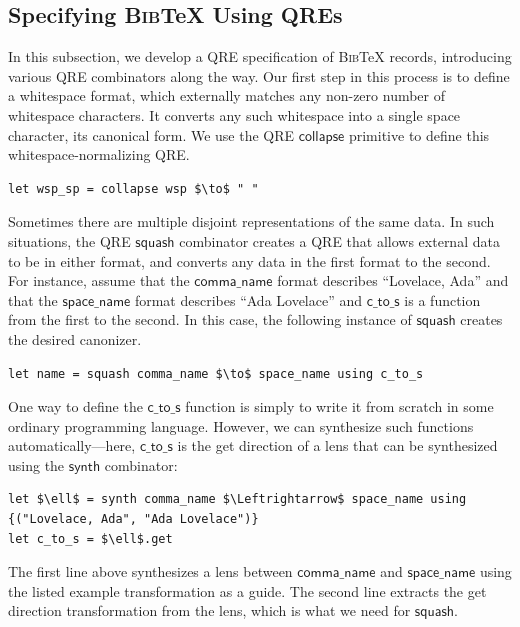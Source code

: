 \documentclass[acmsmall,review,anonymous]{acmart}
\newcommand{\codefont}[1]{\ensuremath{\mathsf{#1}}}
\newcommand{\kw}[1]{\textcolor{dkred}{\ensuremath{\mathsf{#1}}}}
\newcommand{\bibtex}{\textsc{Bib}\TeX{}}
\begin{document}
\subsection{Specifying \bibtex{} Using QREs}
\label{subsec:qre-expressions}
In this subsection, we develop a QRE specification of \bibtex{}
records, introducing various QRE combinators along the way. 
Our first step in this process is to define a
whitespace format, which externally matches any non-zero number of whitespace
characters. It converts any such whitespace into a single space
character, its canonical form. 
We use the QRE \kw{collapse} primitive to define this
whitespace-normalizing QRE.

\begin{lstlisting}
let wsp_sp = collapse wsp $\to$ " "
\end{lstlisting}
\iflastminute
\fi

Sometimes there are multiple disjoint representations of the same data.
In such situations, the QRE \kw{squash} combinator creates a QRE that
allows external data to be in either format, and converts any
data in the first format to the second.
For instance, assume that
the \codefont{comma\_name} format describes ``Lovelace, Ada''
and that the \codefont{space\_name} format describes ``Ada Lovelace''
and \codefont{c\_to\_s} is a function from the first to the second.  In this
case, the following instance of \kw{squash} creates the desired canonizer.


\begin{lstlisting}
let name = squash comma_name $\to$ space_name using c_to_s
\end{lstlisting}

One way to define the \codefont{c\_to\_s} function
is simply to write it from scratch in some ordinary programming language.
However, we can synthesize such functions automatically---here, \codefont{c\_to\_s} is the
get direction of a lens that can be synthesized using the 
\kw{synth} combinator:
%
\begin{lstlisting}
let $\ell$ = synth comma_name $\Leftrightarrow$ space_name using {("Lovelace, Ada", "Ada Lovelace")}
let c_to_s = $\ell$.get 
\end{lstlisting}
\noindent
The first line above synthesizes a lens between \codefont{comma\_name} and
\codefont{space\_name} using the listed example transformation as a guide.  The
second line extracts the get direction transformation from the lens,
which is what we need for \kw{squash}.
\end{document}
